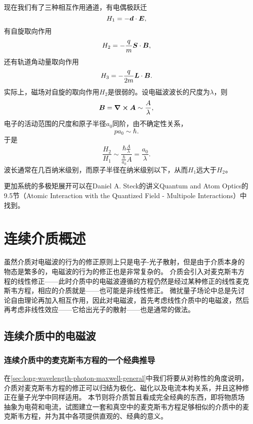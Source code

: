 现在我们有了三种相互作用通道，有电偶极跃迁
\begin{equation}
    H_1 = - \vb*{d} \cdot \vb*{E},
\end{equation}
有自旋取向作用
\begin{equation}
    H_2 = - \frac{q}{m} \vb*{S} \cdot \vb*{B},
\end{equation}
还有轨道角动量取向作用
\begin{equation}
    H_3 = - \frac{q}{2m} \vb*{L} \cdot \vb*{B}.
\end{equation}
实际上，磁场对自旋的取向作用${H}_2$是很弱的。设电磁波波长的尺度为$\lambda$，则
\[
    \vb*{B} = \curl{\vb*{A}} \sim \frac{A}{\lambda},
\]
电子的活动范围的尺度和原子半径$a_0$同阶，由不确定性关系，
\[
    p a_0 \sim \hbar.
\]
于是
\[
    \frac{H_2}{H_1} \sim \frac{\hbar \frac{A}{\lambda}}{\frac{\hbar}{a_0} A} = \frac{a_0}{\lambda}.
\]
波长通常在几百纳米级别，而原子半径在纳米级别以下，从而${H}_1$远大于${H}_2$。

更加系统的多极矩展开可以在Daniel A. Steck的讲义Quantum and Atom Optics的9.5节（Atomic Interaction with the Quantized Field - Multipole Interactions）中找到。

\chapter{连续介质概述}

虽然介质对电磁波的行为的修正原则上只是电子-光子散射，但是由于介质本身的物态是繁多的，电磁波的行为的修正也是非常复杂的。
介质会引入对麦克斯韦方程的线性修正——此时介质中的电磁波遵循的方程仍然是经过某种修正的线性麦克斯韦方程，相应的介质就是——也可能是非线性修正。
微扰量子场论中总是先讨论自由理论再加入相互作用，因此对电磁波，首先考虑线性介质中的电磁波，然后再考虑非线性效应——它给出光子的散射——也是通常的做法。

\section{连续介质中的电磁波}

\subsection{连续介质中的麦克斯韦方程的一个经典推导}\label{sec:classical-continuum}

在\autoref{sec:long-wavelength-photon-maxwell-general}中我们将要从对称性的角度说明，介质对麦克斯韦方程的修正可以归结为极化、磁化以及电流本构关系，并且这种修正在量子光学中同样适用。
本节则将介质暂且看成完全经典的东西，即将物质场抽象为电荷和电流，试图建立一套和真空中的麦克斯韦方程足够相似的介质中的麦克斯韦方程，并为其中各项提供直观的、经典的意义。

